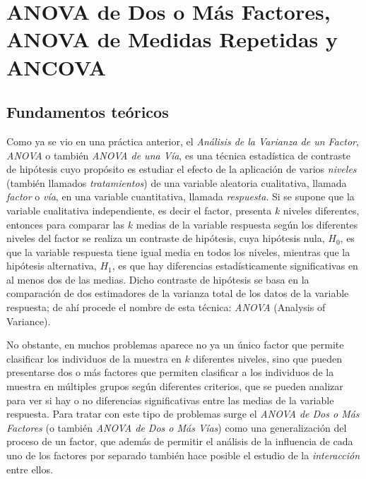 
\chapter{ANOVA de Dos o Más Factores, ANOVA de Medidas Repetidas y ANCOVA}

\medskip
\section{Fundamentos teóricos}

Como ya se vio en una práctica anterior, el \emph{Análisis de la Varianza de un Factor},
\emph{ANOVA} o también \emph{ANOVA de una Vía}, es una técnica
estadística de contraste de hipótesis cuyo propósito es estudiar
el efecto de la aplicación de varios \emph{niveles} (también
llamados \emph{tratamientos}) de una variable aleatoria
cualitativa, llamada \emph{factor} o \emph{vía}, en una variable cuantitativa,
llamada \emph{respuesta}. Si se supone que la variable cualitativa independiente,
es decir el factor, presenta $k$ niveles diferentes, entonces para comparar
las $k$ medias de la variable respuesta según los
diferentes niveles del factor se realiza un contraste de
hipótesis, cuya hipótesis nula, $H_0$, es que la variable
respuesta tiene igual media en todos los niveles, mientras que la
hipótesis alternativa, $H_1$, es que hay diferencias
estadísticamente significativas en al menos dos de las medias. Dicho contraste de hipótesis se basa en la comparación de dos
estimadores de la varianza total de los datos de la variable
respuesta; de ahí procede el nombre de esta técnica: \emph{ANOVA}
(Analysis of Variance).

No obstante, en muchos problemas aparece no ya un único factor que permite clasificar los individuos de la muestra en $k$ diferentes
niveles, sino que pueden presentarse dos o más factores que permiten clasificar a los individuos de la muestra en múltiples grupos según
diferentes criterios, que se pueden analizar para ver si hay o no diferencias significativas entre las medias de la variable respuesta. Para
tratar con este tipo de problemas surge el \emph{ANOVA de Dos o Más Factores} (o también \emph{ANOVA de Dos o Más Vías}) como una
generalización del proceso de un factor, que además de permitir el análisis de la influencia de cada uno de los factores por separado
también hace posible el estudio de la \emph{interacción} entre ellos.

